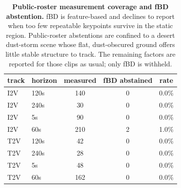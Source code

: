 \begin{table}[tb]
\centering
\small
\begin{tabular}{llccc}
\toprule
track & horizon & measured & fBD abstained & rate \\
\midrule
I2V & 120s & 140 & 0 & 0.0\% \\
I2V & 240s & 30 & 0 & 0.0\% \\
I2V & 5s & 90 & 0 & 0.0\% \\
I2V & 60s & 210 & 2 & 1.0\% \\
T2V & 120s & 42 & 0 & 0.0\% \\
T2V & 240s & 28 & 0 & 0.0\% \\
T2V & 5s & 48 & 0 & 0.0\% \\
T2V & 60s & 162 & 0 & 0.0\% \\
\bottomrule
\end{tabular}
\caption{\textbf{Public-roster measurement coverage and fBD abstention.} fBD is feature-based and declines to report when too few repeatable keypoints survive in the static region. Public-roster abstentions are confined to a desert dust-storm scene whose flat, dust-obscured ground offers little stable structure to track. The remaining factors are reported for those clips as usual; only fBD is withheld.}
\label{tab:abstention}
\end{table}